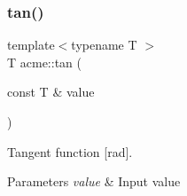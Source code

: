 \subsubsection{\texorpdfstring{tan()}{tan()}}
{\footnotesize\ttfamily template$<$typename T $>$ \\
T acme\+::tan (\begin{DoxyParamCaption}\item[{const T \&}]{value }\end{DoxyParamCaption})\hspace{0.3cm}{\ttfamily [inline]}}



Tangent function \mbox{[}rad\mbox{]}. 


\begin{DoxyParams}{Parameters}
{\em value} & Input value \\
\hline
\end{DoxyParams}
